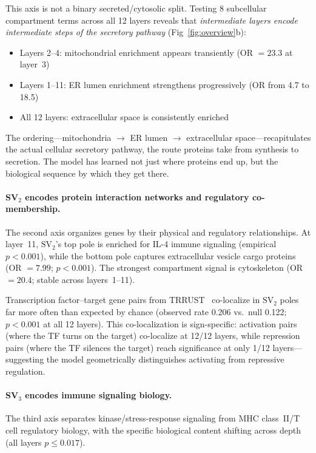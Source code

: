 \documentclass[12pt]{article}
\newcommand{\SV}[1]{\mathrm{SV}_{#1}}
\begin{document}
This axis is not a binary secreted/cytosolic split.
Testing 8 subcellular compartment terms across all 12 layers reveals that \emph{intermediate layers encode intermediate steps of the secretory pathway} (Fig~\ref{fig:overview}b):
\begin{itemize}
  \item Layers 2--4: mitochondrial enrichment appears transiently (OR $= 23.3$ at layer~3)
  \item Layers 1--11: ER lumen enrichment strengthens progressively (OR from 4.7 to 18.5)
  \item All 12 layers: extracellular space is consistently enriched
\end{itemize}
The ordering---mitochondria $\to$ ER lumen $\to$ extracellular space---recapitulates the actual cellular secretory pathway, the route proteins take from synthesis to secretion.
The model has learned not just where proteins end up, but the biological sequence by which they get there.

\paragraph{SV$_2$ encodes protein interaction networks and regulatory co-membership.}
The second axis organizes genes by their physical and regulatory relationships.
At layer~11, $\SV{2}$'s top pole is enriched for IL-4 immune signaling (empirical $p < 0.001$), while the bottom pole captures extracellular vesicle cargo proteins (OR $= 7.99$; $p < 0.001$).
The strongest compartment signal is cytoskeleton (OR $= 20.4$; stable across layers~1--11).

Transcription factor--target gene pairs from TRRUST~\cite{han2018trrust} co-localize in $\SV{2}$ poles far more often than expected by chance (observed rate 0.206 vs.\ null 0.122; $p < 0.001$ at all 12 layers).
This co-localization is sign-specific: activation pairs (where the TF turns on the target) co-localize at 12/12 layers, while repression pairs (where the TF silences the target) reach significance at only 1/12 layers---suggesting the model geometrically distinguishes activating from repressive regulation.

\paragraph{SV$_3$ encodes immune signaling biology.}
The third axis separates kinase/stress-response signaling from MHC class~II/T cell regulatory biology, with the specific biological content shifting across depth (all layers $p \leq 0.017$).
\end{document}
